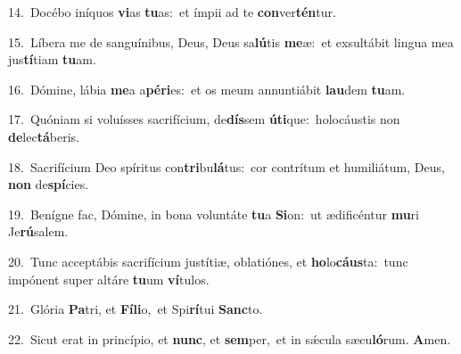 {\numbfont\textcolor{\numbcolor}{14.}}~Docébo iníquos \textbf{vi}\-as \textbf{tu}\-as:~\star et ímpii ad te \textbf{con}\-ver\-\textbf{tén}\-tur.\par
{\numbfont\textcolor{\numbcolor}{15.}}~Líbera me de sanguínibus, Deus, Deus sa\-\textbf{lú}\-tis \textbf{me}\-æ:~\star et exsultábit lingua mea jus\-\textbf{tí}\-tiam \textbf{tu}\-am.\par
{\numbfont\textcolor{\numbcolor}{16.}}~Dómine, lábia \textbf{me}\-a a\-\textbf{pé}\-\textbf{ri}es:~\star et os meum annuntiábit \textbf{lau}\-dem \textbf{tu}\-am.\par
{\numbfont\textcolor{\numbcolor}{17.}}~Quóniam si voluísses sacrifícium, de\-\textbf{dís}\-sem \textbf{ú}\-\textbf{ti}que:~\star holocáustis non \textbf{de}\-lec\-\textbf{tá}\-beris.\par
{\numbfont\textcolor{\numbcolor}{18.}}~Sacrifícium Deo spíritus con\-\textbf{tri}\-bu\-\textbf{lá}\-tus:~\star cor contrítum et humiliátum, Deus, \textbf{non} de\-\textbf{spí}\-cies.\par
{\numbfont\textcolor{\numbcolor}{19.}}~Benígne fac, Dómine, in bona voluntáte \textbf{tu}\-a \textbf{Si}\-on:~\star ut ædificéntur \textbf{mu}\-ri Je\-\textbf{rú}\-salem.\par
{\numbfont\textcolor{\numbcolor}{20.}}~Tunc acceptábis sacrifícium justítiæ, oblatiónes, et \textbf{ho}\-lo\-\textbf{cáus}\-ta:~\star tunc impónent super altáre \textbf{tu}\-um \textbf{ví}\-tulos.\par
{\numbfont\textcolor{\numbcolor}{21.}}~Glória \textbf{Pa}\-tri, et \textbf{Fí}\-\textbf{li}o,~\star et Spi\-\textbf{rí}\-tui \textbf{Sanc}\-to.\par
{\numbfont\textcolor{\numbcolor}{22.}}~Sicut erat in princípio, et \textbf{nunc}\-, et \textbf{sem}\-per,~\star et in sǽcula sæcu\-\textbf{ló}\-rum. \textbf{A}\-men.\par
